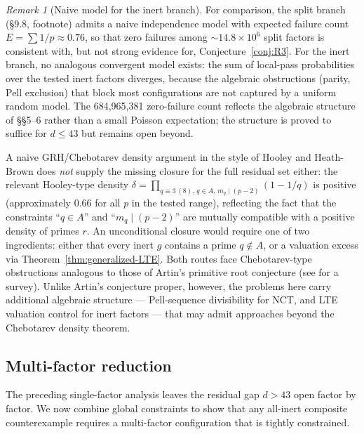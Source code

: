 \documentclass[12pt]{article}
\theoremstyle{plain}
\theoremstyle{definition}
\theoremstyle{remark}
\newtheorem{remark}[theorem]{Remark}
\begin{document}
\begin{remark}[Naive model for the inert branch]\label{rem:inert-heuristic}
For comparison, the split branch (\S9.8, footnote) admits a naive
independence model with expected failure count
\(E = \sum 1/p \approx 0.76\), so that zero failures among
\({\sim}14.8 \times 10^6\) split factors is consistent with, but
not strong evidence for, Conjecture~\ref{conj:R3}. For the inert
branch, no analogous convergent model exists: the sum of
local-pass probabilities over the tested inert factors diverges,
because the algebraic obstructions (parity, Pell exclusion) that
block most configurations are not captured by a uniform random
model. The 684{,}965{,}381 zero-failure count reflects the
algebraic structure of \S\S5--6 rather than a small Poisson
expectation; the structure is proved to suffice for \(d \leq 43\)
but remains open beyond.
\end{remark}

A naive GRH/Chebotarev density argument in the style of Hooley
\cite{ref10} and Heath-Brown \cite{ref9} does \emph{not} supply the missing closure
for the full residual set either: the relevant Hooley-type density
\(\delta = \prod_{q \equiv 3\,(8),\,q \in A,\,m_q \mid (p-2)}
(1 - 1/q)\)
is positive (approximately \(0.66\) for all \(p\) in the tested
range), reflecting the fact that the constraints ``\(q \in A\)''
and ``\(m_q \mid (p-2)\)'' are mutually compatible with a positive
density of primes \(r\). An unconditional closure would require
one of two ingredients: either that every inert \(g\) contains a
prime \(q \notin A\), or a valuation excess via Theorem~\ref{thm:generalized-LTE}. Both
routes face Chebotarev-type obstructions analogous to those of
Artin's primitive root conjecture (see \cite{ref15} for a survey). Unlike
Artin's conjecture proper, however, the problems here carry
additional algebraic structure --- Pell-sequence divisibility for
NCT, and LTE valuation control for inert factors --- that may
admit approaches beyond the Chebotarev density theorem.

\subsection{Multi-factor reduction}\label{sec:multi-factor}

The preceding single-factor analysis leaves the residual gap
\(d > 43\) open factor by factor. We now combine global constraints
to show that any all-inert composite counterexample requires a
multi-factor configuration that is tightly constrained.
\end{document}
